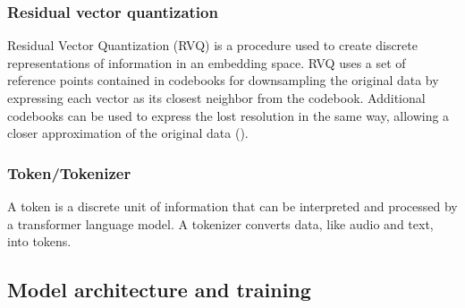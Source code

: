 \documentclass[a4paper,12pt,twoside]{article}
\newenvironment{aigen}{\begin{tcolorbox}[colback=blue!5!white, colframe=blue!75!black, title=AI-Generated Section]}{\end{tcolorbox}}
\begin{document}
\subsubsection*{Residual vector quantization}\label{sec:RVQ}

Residual Vector Quantization (RVQ) is a procedure used to create discrete representations of information in an embedding space. RVQ uses a set of  reference points contained in codebooks for downsampling the original data by expressing each vector as its closest neighbor from the codebook. Additional codebooks can be used to express the lost resolution in the same way, allowing a closer approximation of the original data (\cite{zeghidourSoundStreamEndtoEndNeural2021}).



\subsubsection*{Token/Tokenizer}\label{sec:Token}

A token is a discrete unit of information that can be interpreted and processed by a transformer language model. A tokenizer converts data, like audio and text, into tokens.


\subsection{Model architecture and training}
\end{document}
